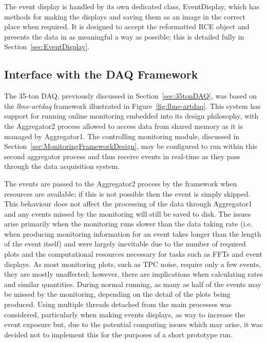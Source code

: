The event display is handled by its own dedicated class, EventDisplay, which has methods for making the displays and saving them as an image in the correct place when required.  It is designed to accept the reformatted RCE object and presents the data in as meaningful a way as possible; this is detailed fully in Section~\ref{sec:EventDisplay}.

\subsection{Interface with the DAQ Framework}

The 35-ton DAQ, previously discussed in Section~\ref{sec:35tonDAQ}, was based on the \textit{lbne-artdaq} framework illustrated in Figure~\ref{fig:lbne-artdaq}.  This system has support for running online monitoring embedded into its design philosophy, with the Aggregator2 process allowed to access data from shared memory as it is managed by Aggregator1.  The controlling monitoring module, discussed in Section~\ref{sec:MonitoringFrameworkDesign}, may be configured to run within this second aggregator process and thus receive events in real-time as they pass through the data acquisition system.

The events are passed to the Aggregator2 process by the framework when resources are available; if this is not possible then the event is simply skipped.  This behaviour does not affect the processing of the data through Aggregator1 and any events missed by the monitoring will still be saved to disk.  The issues arise primarily when the monitoring runs slower than the data taking rate (i.e. when producing monitoring information for an event takes longer than the length of the event itself) and were largely inevitable due to the number of required plots and the computational resources necessary for tasks such as FFTs and event displays.  As most monitoring plots, such as TPC noise, require only a few events, they are mostly unaffected; however, there are implications when calculating rates and similar quantities.  During normal running, as many as half of the events may be missed by the monitoring, depending on the detail of the plots being produced.  Using multiple threads detached from the main processes was considered, particularly when making events displays, as way to increase the event exposure but, due to the potential computing issues which may arise, it was decided not to implement this for the purposes of a short prototype run.

